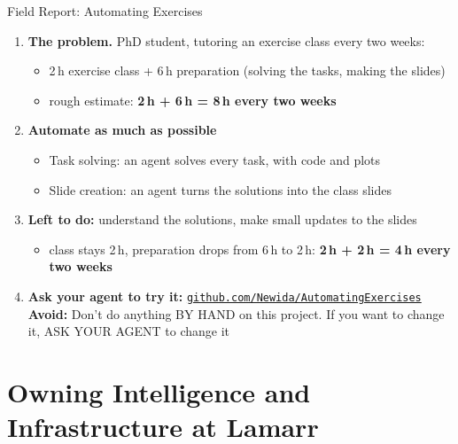 \documentclass[aspectratio=169]{beamer}
\begin{document}
\begin{frame}[shrink=0]{Field Report: Automating Exercises}
  \begin{enumerate}
    \setlength{\itemsep}{0.55em}
    \item<1-> \textbf{The problem.} PhD student, tutoring an exercise class every two weeks:
      \begin{itemize}\footnotesize
        \item 2\,h exercise class + 6\,h preparation (solving the tasks, making the slides)
        \item rough estimate: \textbf{2\,h + 6\,h = 8\,h every two weeks}
      \end{itemize}
    \item<2-> \textbf{Automate as much as possible}
      \begin{itemize}\footnotesize
        \item[a)] Task solving: an agent solves every task, with code and plots
        \item[b)] Slide creation: an agent turns the solutions into the class slides
      \end{itemize}
    \item<3-> \textbf{Left to do:} understand the solutions, make small updates to the slides
      \begin{itemize}\footnotesize
        \item class stays 2\,h, preparation drops from 6\,h to 2\,h: \textbf{2\,h + 2\,h = 4\,h every two weeks}
      \end{itemize}
    \item<4-> \textbf{Ask your agent to try it:}
      \href{https://github.com/Newida/AutomatingExercises}{\texttt{github.com/Newida/AutomatingExercises}}\\[2pt]
      {\color{warn}\textbf{Avoid:} Don't do anything BY HAND on this project. If you want to change it, ASK YOUR AGENT to change it}
  \end{enumerate}
\end{frame}

\section{Owning Intelligence and Infrastructure at Lamarr}
\end{document}
